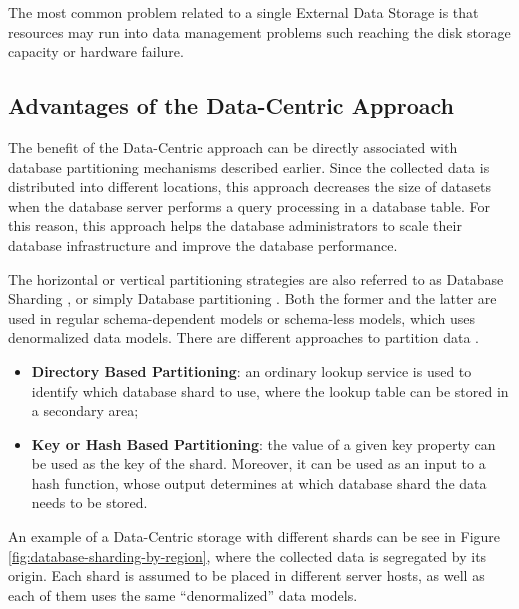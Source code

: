 The most common problem related to a single External Data Storage is that 
resources may run into data management problems such reaching the disk storage
capacity or hardware failure.

\subsection{Advantages of the Data-Centric Approach}

The benefit of the Data-Centric approach can be directly associated with
database partitioning mechanisms described earlier. Since the collected data is
distributed into different locations, this approach decreases the size of
datasets when the database server performs a query processing in a database
table. For this reason, this approach helps the database administrators to
scale their database infrastructure and improve the database performance.

The horizontal or vertical partitioning strategies are also referred to as
Database Sharding \cite{db-shard-discussion}, or simply Database partitioning
\cite{db-partitioning-relational}. Both the former and the
latter are used in regular schema-dependent models or schema-less models,
which uses denormalized data models. There are different approaches to
partition data \cite{db-shard-schemas, db-partitioning-relational}.

\begin{itemize}
  \item \textbf{Directory Based Partitioning}: an ordinary lookup service is
  used to identify which database shard to use, where the lookup table can be
  stored in a secondary area;
  \item \textbf{Key or Hash Based Partitioning}: the value of a given key
  property can  be used as the key of the shard. Moreover, it can be used as 
  an input to a hash function, whose output determines at which database shard
  the data needs to be stored.
\end{itemize}

An example of a Data-Centric storage with different shards can be see in Figure
\ref{fig:database-sharding-by-region}, where the collected data is segregated
by its origin. Each shard is assumed to be placed in different server
hosts, as well as each of them uses the same ``denormalized'' data models.

